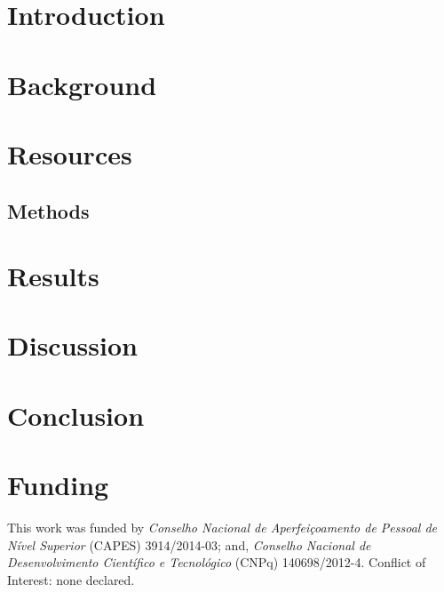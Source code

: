 \documentclass{bioinfo}
\begin{document}
\maketitle

\section{Introduction}


\section{Background}


\section{Resources}
\label{sec:resources}


\begin{methods}
\section{Methods}

\end{methods}

\section{Results}


\section{Discussion}


\section{Conclusion}


\section*{Funding}

This work was funded by \textit{Conselho Nacional de Aperfei\c{c}oamento de Pessoal de N\'{i}vel Superior} (CAPES) 3914/2014-03; and, \textit{Conselho Nacional de Desenvolvimento Cient\'{i}fico e Tecnol\'{o}gico} (CNPq) 140698/2012-4.
Conflict of Interest: none declared. \vspace*{-12pt}


%
%
%
%
%
%
%



%	
\end{document}
